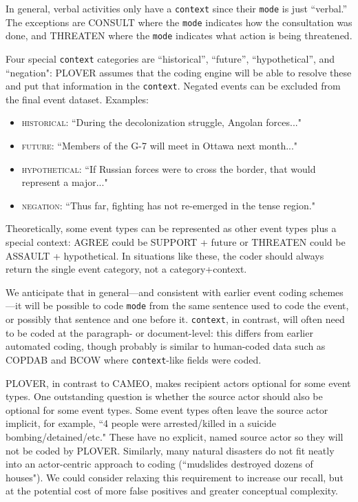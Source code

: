 \documentclass[11pt]{report}
\newcommand{\plcat}[1]{\textsf{#1}}
\begin{document}
In general, verbal activities only have a \texttt{context} since their \texttt{mode} is just ``verbal.'' The exceptions are \plcat{CONSULT} where the \texttt{mode} indicates how the consultation was done, and \plcat{THREATEN} where the \texttt{mode} indicates what action is being threatened. 

Four special \texttt{context} categories are ``historical'', ``future'', ``hypothetical'', and ``negation": PLOVER assumes that the coding engine will be able to resolve these and put that information in the \texttt{context}. Negated events can be excluded from the final event dataset. Examples:
   \begin{itemize}
   \item \textsc{historical}: ``During the decolonization struggle, Angolan forces..."
   \item \textsc{future}: ``Members of the G-7 will meet in Ottawa next month..."
   \item \textsc{hypothetical}: ``If Russian forces were to cross the border, that would represent a major..."
   \item \textsc{negation}: ``Thus far, fighting has not re-emerged in the tense region."	
   \end{itemize}
  
Theoretically, some event types can be represented as other event types plus a special context: \plcat{AGREE} could be  \plcat{SUPPORT} + future or \plcat{THREATEN} could be \plcat{ASSAULT} + hypothetical. In situations like these, the coder should always return the single event category, not a category+context.


We anticipate that in general---and consistent with earlier event coding schemes---it will be possible to code \texttt{mode} from the same sentence used to code the event, or possibly that sentence and one before it. \texttt{context}, in contrast, will often need to be coded at the paragraph- or document-level: this differs from earlier automated coding, though probably is similar to human-coded data such as COPDAB and BCOW where \texttt{context}-like fields were coded.

PLOVER, in contrast to CAMEO, makes recipient actors optional for some event types. One outstanding question is whether the source actor should also be optional for some event types. Some event types often leave the source actor implicit, for example, ``4 people were arrested/killed in a suicide bombing/detained/etc." These have no explicit, named source actor so they will not be coded by PLOVER. Similarly, many natural disasters do not fit neatly into an actor-centric approach to coding (``mudslides destroyed dozens of houses"). We could consider relaxing this requirement to increase our recall, but at the potential cost of more false positives and greater conceptual complexity.
\end{document}
